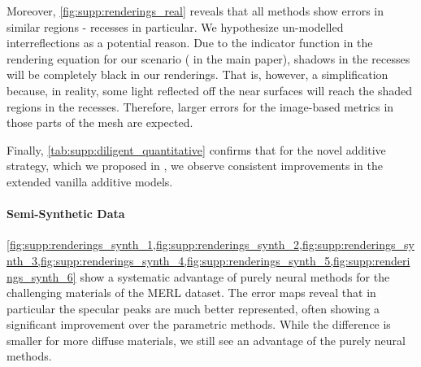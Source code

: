 Moreover, \cref{fig:supp:renderings_real} reveals that all methods show errors in similar regions - recesses in particular. We hypothesize un-modelled interreflections as a potential reason. Due to the indicator function in the rendering equation for our scenario
(\iftoggle{arxiv}{\cref{eq:rendering_single_dir_light}}{Eq.~(9)} in the main paper),
shadows in the recesses will be completely black in our renderings. That is, however, a simplification because, in reality, some light reflected off the near surfaces will reach the shaded regions in the recesses. Therefore, larger errors for the image-based metrics in those parts of the mesh are expected.

Finally, \cref{tab:supp:diligent_quantitative} confirms that for the novel additive strategy, which we proposed in
\iftoggle{arxiv}{\cref{sec:enhancingAddSplit}}{Sec.~4.4},
we observe consistent improvements in the extended vanilla additive models.

\paragraph{Semi-Synthetic Data}
\cref{fig:supp:renderings_synth_1,fig:supp:renderings_synth_2,fig:supp:renderings_synth_3,fig:supp:renderings_synth_4,fig:supp:renderings_synth_5,fig:supp:renderings_synth_6} show a systematic advantage of purely neural methods for the challenging materials of the MERL dataset. The error maps reveal that in particular the specular peaks are much better represented, often showing a significant improvement over the parametric methods. While the difference is smaller for more diffuse materials, we still see an advantage of the purely neural methods.









